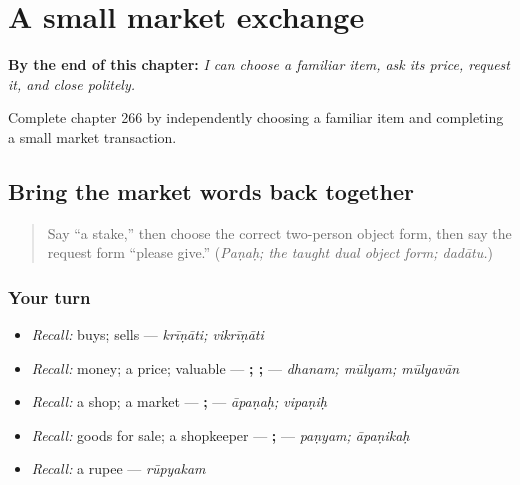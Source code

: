 
\chapter{A small market exchange}
\label{ch:sa-small-market-exchange}

\begin{chapteropening}
\textbf{By the end of this chapter:} \emph{I can choose a familiar item, ask its price, request it, and close politely.}

Complete chapter 266 by independently choosing a familiar item and completing a small market transaction.
\end{chapteropening}

\section[Practice]{Bring the market words back together}

\label{lesson:SA-C266-market-recall}



\begin{quote}
Say “a stake,” then choose the correct two-person object form, then say the request form “please give.” (\emph{Paṇaḥ; the taught dual object form; dadātu.})
\end{quote}

\subsection*{Your turn}
\begin{itemize}
\raggedright
  \item \emph{Recall:} buys; sells — \emph{krīṇāti; vikrīṇāti}
  \item \emph{Recall:} money; a price; valuable — \textbf{; ; } — \emph{dhanam; mūlyam; mūlyavān}
  \item \emph{Recall:} a shop; a market — \textbf{; } — \emph{āpaṇaḥ; vipaṇiḥ}
  \item \emph{Recall:} goods for sale; a shopkeeper — \textbf{; } — \emph{paṇyam; āpaṇikaḥ}
  \item \emph{Recall:} a rupee — \emph{rūpyakam}
\end{itemize}

